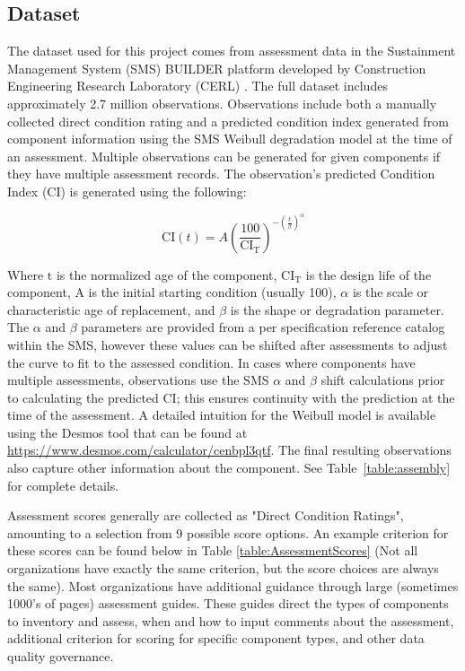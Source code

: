 \documentclass[NewProceedings,letterpaper,NoPageNumbers,NoLineNumbers, DoubleSpace]{ascelike-new}
\begin{document}
\subsection{Dataset}

The dataset used for this project comes from assessment data in the Sustainment Management System (SMS) BUILDER platform developed by Construction Engineering Research Laboratory (CERL) \cite{erdc_sms_roc}. The full dataset includes approximately 2.7 million observations. Observations include both a manually collected direct condition rating and a predicted condition index generated from component information using the SMS Weibull degradation model at the time of an assessment. Multiple observations can be generated for given components if they have multiple assessment records. The observation's predicted Condition Index (CI) is generated using the following:

\begin{equation}
\label{eq:sms-weibull-ci}
\mathrm{CI}(t) = A \left( \frac{100}{\mathrm{CI}_{\mathrm{T}}} \right)^{ -\left(\frac{t}{\beta}\right)^{\alpha} }
\end{equation}

Where $\mathrm{t}$ is the normalized age of the component, $\mathrm{CI_T}$ is the design life of the component, A is the initial starting condition (usually 100), $\alpha$ is the scale or characteristic age of replacement, and $\beta$ is the shape or degradation parameter. The $\alpha$ and $\beta$ parameters are provided from a per specification reference catalog within the SMS, however these values can be shifted after assessments to adjust the curve to fit to the assessed condition. In cases where components have multiple assessments, observations use the SMS $\alpha$ and $\beta$ shift calculations prior to calculating the predicted CI; this ensures continuity with the prediction at the time of the assessment. A detailed intuition for the Weibull model is available using the Desmos tool that can be found at \url{https://www.desmos.com/calculator/cenbpl3qtf}. The final resulting observations also capture other information about the component. See Table~\ref{table:assembly} for complete details.

Assessment scores generally are collected as "Direct Condition Ratings", amounting to a selection from 9 possible score options. An example criterion for these scores can be found below in Table \ref{table:AssessmentScores} (Not all organizations have exactly the same criterion, but the score choices are always the same). Most organizations have additional guidance through large (sometimes 1000's of pages) assessment guides. These guides direct the types of components to inventory and assess, when and how to input comments about the assessment, additional criterion for scoring for specific component types, and other data quality governance. 
\end{document}
